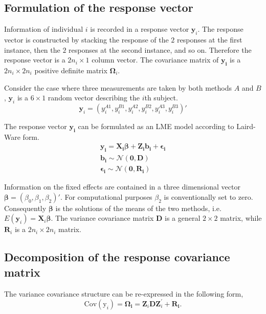 \documentclass[12pt, a4paper]{report}
\theoremstyle{plain}
\theoremstyle{definition}
\theoremstyle{remark}
\begin{document}
	
	\subsection{Formulation of the response vector}
	Information of individual $i$ is recorded in a response vector $\boldsymbol{y}_{i}$. The response vector is constructed by stacking the response of the $2$ responses at the first instance, then the $2$ responses at the second instance, and so on. Therefore the response vector is a $2n_{i} \times 1$ column vector.
	The covariance matrix of $\boldsymbol{y_{i}}$ is a $2n_{i} \times 2n_{i}$ positive definite matrix $\boldsymbol{\Omega}_{i}$.
	
	Consider the case where three measurements are taken by both methods $A$ and $B$, $\boldsymbol{y}_{i}$ is a $6 \times 1$ random vector describing the $i$th subject.
	\[
	\boldsymbol{y}_{i} = (y_{i}^{A1},y_{i}^{B1},y_{i}^{A2},y_{i}^{B2},y_{i}^{A3},y_{i}^{B3}) \prime
	\]
	
	The response vector $\boldsymbol{y_{i}}$ can be formulated as an LME model according to Laird-Ware form.
	\begin{eqnarray*}
		\boldsymbol{y_{i}} = \boldsymbol{X_{i}\beta}  + \boldsymbol{Z_{i}b_{i}} + \boldsymbol{\epsilon_{i}}\\
		\boldsymbol{b_{i}} \sim \mathcal{N}(\boldsymbol{0,D})\\
		\boldsymbol{\epsilon_{i}} \sim \mathcal{N}(\boldsymbol{0,R_{i}})
	\end{eqnarray*}
	
	Information on the fixed effects are contained in a three dimensional vector $\boldsymbol{\beta} = (\beta_{0},\beta_{1},\beta_{2})\prime$. For computational purposes $\beta_{2}$ is conventionally set to zero. Consequently $\boldsymbol{\beta}$ is the solutions of the means of the two methods, i.e. $E(\boldsymbol{y}_{i})  = \boldsymbol{X}_{i}\boldsymbol{\beta}$. The variance covariance matrix $\boldsymbol{D}$ is a general $2 \times 2$ matrix, while $\boldsymbol{R}_{i}$ is a $2n_{i} \times 2n_{i}$ matrix.
	
	\subsection{Decomposition of the response covariance matrix}
	
	The variance covariance structure can be re-expressed in the following form,
	\[
	\mbox{Cov}(\mbox{y}_{i}) = \boldsymbol{\Omega_{i}} = \boldsymbol{Z}_{i}\boldsymbol{D}\boldsymbol{Z}_{i}^\prime + \boldsymbol{R_{i}}.
	\]
	
\end{document}
